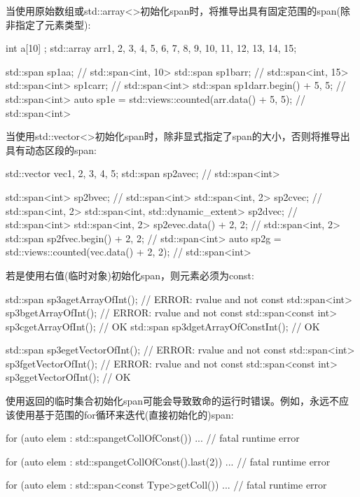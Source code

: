 当使用原始数组或std::array<>初始化span时，将推导出具有固定范围的span(除非指定了元素类型):

\begin{cpp}
int a[10] {};
std::array arr{1, 2, 3, 4, 5, 6, 7, 8, 9, 10, 11, 12, 13, 14, 15};

std::span sp1a{a}; // std::span<int, 10>
std::span sp1b{arr}; // std::span<int, 15>
std::span<int> sp1c{arr}; // std::span<int>
std::span sp1d{arr.begin() + 5, 5}; // std::span<int>
auto sp1e = std::views::counted(arr.data() + 5, 5); // std::span<int>
\end{cpp}

当使用std::vector<>初始化span时，除非显式指定了span的大小，否则将推导出具有动态区段的span:

\begin{cpp}
std::vector vec{1, 2, 3, 4, 5};
std::span sp2a{vec}; // std::span<int>

std::span<int> sp2b{vec}; // std::span<int>
std::span<int, 2> sp2c{vec}; // std::span<int, 2>
std::span<int, std::dynamic_extent> sp2d{vec}; // std::span<int>
std::span<int, 2> sp2e{vec.data() + 2, 2}; // std::span<int, 2>
std::span sp2f{vec.begin() + 2, 2}; // std::span<int>
auto sp2g = std::views::counted(vec.data() + 2, 2); // std::span<int>
\end{cpp}

若是使用右值(临时对象)初始化span，则元素必须为const:

\begin{cpp}
std::span sp3a{getArrayOfInt()}; // ERROR: rvalue and not const
std::span<int> sp3b{getArrayOfInt()}; // ERROR: rvalue and not const
std::span<const int> sp3c{getArrayOfInt()}; // OK
std::span sp3d{getArrayOfConstInt()}; // OK

std::span sp3e{getVectorOfInt()}; // ERROR: rvalue and not const
std::span<int> sp3f{getVectorOfInt()}; // ERROR: rvalue and not const
std::span<const int> sp3g{getVectorOfInt()}; // OK
\end{cpp}

使用返回的临时集合初始化span可能会导致致命的运行时错误。例如，永远不应该使用基于范围的for循环来迭代(直接初始化的)span:

\begin{cpp}
for (auto elem : std::span{getCollOfConst()}) ... // fatal runtime error

for (auto elem : std::span{getCollOfConst()}.last(2)) ... // fatal runtime error

for (auto elem : std::span<const Type>{getColl()}) ... // fatal runtime error
\end{cpp}

